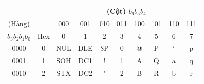 \begin{table}[h!]
    \centering
    \begin{tabular}{|c|c|cccccccc|}
    \hline
                   &                            & \multicolumn{8}{c|}{(Cột) $b_6b_5b_4$}                                                                                                                                                                                                                                                                                                                                   \\ \hline
    (Hàng)         &                            & \multicolumn{1}{c|}{000}                      & \multicolumn{1}{c|}{001}                      & \multicolumn{1}{c|}{010}                      & \multicolumn{1}{c|}{011}                      & \multicolumn{1}{c|}{100}                      & \multicolumn{1}{c|}{101}                      & \multicolumn{1}{c|}{110}                      & 111                      \\ \hline
    $b_3b_2b_1b_0$ & {\color[HTML]{0000FF} Hex} & \multicolumn{1}{c|}{{\color[HTML]{0000FF} 0}} & \multicolumn{1}{c|}{{\color[HTML]{0000FF} 1}} & \multicolumn{1}{c|}{{\color[HTML]{0000FF} 2}} & \multicolumn{1}{c|}{{\color[HTML]{0000FF} 3}} & \multicolumn{1}{c|}{{\color[HTML]{0000FF} 4}} & \multicolumn{1}{c|}{{\color[HTML]{0000FF} 5}} & \multicolumn{1}{c|}{{\color[HTML]{0000FF} 6}} & {\color[HTML]{0000FF} 7} \\ \hline
    0000           & {\color[HTML]{0000FF} 0}   & \multicolumn{1}{c|}{NUL}                      & \multicolumn{1}{c|}{DLE}                      & \multicolumn{1}{c|}{SP}                       & \multicolumn{1}{c|}{0}                        & \multicolumn{1}{c|}{@}                        & \multicolumn{1}{c|}{P}                        & \multicolumn{1}{c|}{`}                        & p                        \\ 
    0001           & {\color[HTML]{0000FF} 1}   & \multicolumn{1}{c|}{SOH}                      & \multicolumn{1}{c|}{DC1}                      & \multicolumn{1}{c|}{!}                        & \multicolumn{1}{c|}{1}                        & \multicolumn{1}{c|}{A}                        & \multicolumn{1}{c|}{Q}                        & \multicolumn{1}{c|}{a}                        & q                        \\ 
    0010           & {\color[HTML]{0000FF} 2}   & \multicolumn{1}{c|}{STX}                      & \multicolumn{1}{c|}{DC2}                      & \multicolumn{1}{c|}{"}                        & \multicolumn{1}{c|}{2}                        & \multicolumn{1}{c|}{B}                        & \multicolumn{1}{c|}{R}                        & \multicolumn{1}{c|}{b}                        & r                        \\ 

\end{tabular}
\end{table}
